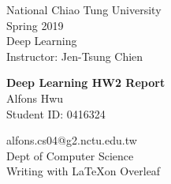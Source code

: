 


\begin{titlepage} %

	
\begin{minipage}{0.4\textwidth} %
    \begin{flushleft} %
    \large
    National Chiao Tung University\\ %
    Spring 2019 \\ %
    Deep Learning \\ %
    Instructor: Jen-Tsung Chien\\ %
    \end{flushleft}
\end{minipage}
	
\vspace*{2in} %
	
\center %

	
{\huge\bfseries Deep Learning HW2 Report}\\[0.4cm] %
Alfons Hwu \\ %
Student ID: 0416324\\
\vfill %


\vfill %

alfons.cs04@g2.nctu.edu.tw \\ %
Dept of Computer Science \\ %
Writing with \LaTeX  on Overleaf

\vfill %


\vfill %
	
\end{titlepage}